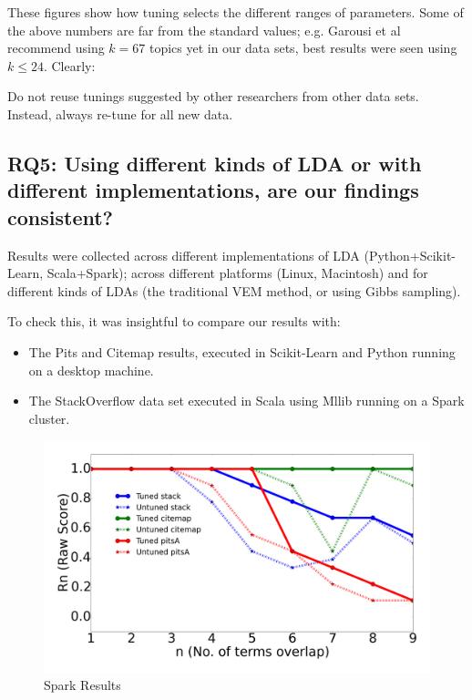 \documentclass[twocolumn,5p,sort&compress]{elsarticle}
\newcommand{\bi}{\begin{itemize}}
\newcommand{\ei}{\end{itemize}}
\theoremstyle{break}
\begin{document}
  These figures
show how tuning selects the different ranges  of
parameters. 
Some of the above numbers are far from the standard values; e.g. Garousi et al~\cite{garousi2016citations} recommend using $k=67$ topics
yet in our data sets, best results were seen using $k \le 24$.
Clearly:

\begin{lesson}
  Do not  reuse tunings suggested by other researchers from other data sets.
  Instead, always re-tune for all new data.
\end{lesson}

\subsection{\textbf{RQ5}: \textbf{Using different kinds of LDA or with different implementations, are our findings consistent?}}

Results were collected across different implementations of LDA (Python+Scikit-Learn, Scala+Spark); across different platforms (Linux, Macintosh) and for different kinds of LDAs (the traditional VEM method, or using Gibbs sampling). 

To check this, it was insightful to compare our results with:
\bi
\item The Pits and Citemap results, executed in Scikit-Learn and Python running on
  a desktop machine.
\item The StackOverflow data set executed in Scala using Mllib running on a Spark cluster.
  \ei

\begin{figure}[!b]
  \captionsetup{justification=centering}
  \includegraphics[width=\linewidth]{./fig/spark.png}
  \caption{Spark Results}
  \label{python_spark}
\end{figure}
\end{document}
